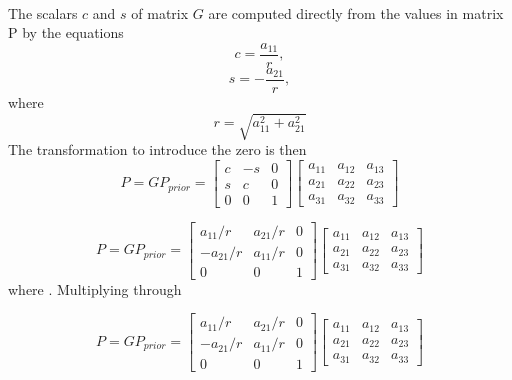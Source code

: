 \documentclass{article}
\begin{document}
\paragraph{}
The scalars $c$ and $s$ of matrix $G$ are computed directly from the values in matrix P by the equations 
\begin{equation}
c = \frac{a_{11}}{r}, 
\end{equation}
\begin{equation}
s = -\frac{a_{21}}{r}, 
\end{equation}
where
\begin{equation}
 r=\sqrt{a_{11}^2 + a_{21}^2}
\end{equation}
The transformation to introduce the zero is then
\begin{equation}
P = GP_{prior} =
\begin{bmatrix}
c & -s & 0\\
s & c & 0\\
0 & 0 & 1
\end{bmatrix}
\begin{bmatrix}
a_{11} & a_{12} & a_{13}\\
a_{21} & a_{22} & a_{23}\\
a_{31} & a_{32} & a_{33}
\end{bmatrix}
\end{equation}

\begin{equation}
P = GP_{prior} =
\begin{bmatrix}
a_{11}/r & a_{21}/r & 0\\
-a_{21}/r & a_{11}/r & 0\\
0 & 0 & 1
\end{bmatrix}
\begin{bmatrix}
a_{11} & a_{12} & a_{13}\\
a_{21} & a_{22} & a_{23}\\
a_{31} & a_{32} & a_{33}
\end{bmatrix}
\end{equation}
where . Multiplying through

\begin{equation}
P = GP_{prior} =
\begin{bmatrix}
a_{11}/r & a_{21}/r & 0\\
-a_{21}/r & a_{11}/r & 0\\
0 & 0 & 1
\end{bmatrix}
\begin{bmatrix}
a_{11} & a_{12} & a_{13}\\
a_{21} & a_{22} & a_{23}\\
a_{31} & a_{32} & a_{33}
\end{bmatrix}
\end{equation}
\end{document}
